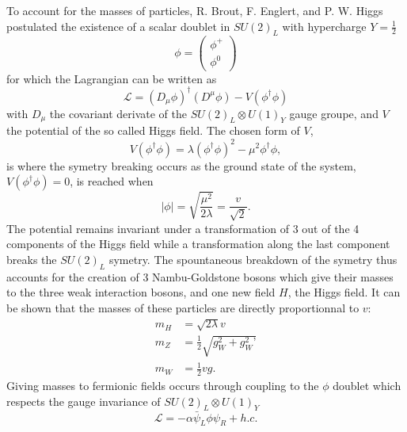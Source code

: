     To account for the masses of particles, R. Brout, F. Englert, and P. W. Higgs postulated the existence of a scalar doublet in $ SU(2)_L $ with hypercharge $ Y = \frac{1}{2} $
    \begin{equation}
      \phi = \left( \begin{matrix} \phi^+ \\ \phi^0 \end{matrix} \right)
    \end{equation}
    for which the Lagrangian can be written as
    \begin{equation}
      \mathcal{L} = \left( D_\mu \phi \right)^\dagger \left( D^\mu \phi \right) - V(\phi^\dagger \phi)
    \end{equation}
    with $ D_\mu $ the covariant derivate of the $ SU(2)_L \otimes U(1)_Y $ gauge groupe, and $ V $ the potential of the so called Higgs field. The chosen form of $ V $,
    \begin{equation}
      V(\phi^\dagger \phi) = \lambda \left( \phi^\dagger \phi \right)^2 - \mu^2 \phi^\dagger \phi ,
    \end{equation}
    is where the symetry breaking occurs as the ground state of the system, $ V(\phi^\dagger \phi) = 0 $, is reached when
    \begin{equation}
      \left| \phi \right| = \sqrt{\frac{\mu^2}{2 \lambda}} = \frac{v}{\sqrt{2}} .
    \end{equation}
    The potential remains invariant under a transformation of 3 out of the 4 components of the Higgs field while a transformation along the last component breaks the $ SU(2)_L $ symetry. The spountaneous breakdown of the symetry thus accounts for the creation of 3 Nambu-Goldstone bosons which give their masses to the three weak interaction bosons, and one new field $ H $, the Higgs field. It can be shown that the masses of these particles are directly proportionnal to $ v $:
    \begin{align}
      m_H & = \sqrt{2 \lambda} v \\
      m_Z & = \frac{1}{2} \sqrt{g_W^2 + g_W^2\text{'}} \\
      m_W & = \frac{1}{2} v g .
    \end{align}
    Giving masses to fermionic fields occurs through coupling to the $ \phi $ doublet which respects the gauge invariance of $ SU(2)_L \otimes U(1)_Y $
    \begin{equation}
      \mathcal{L} = - \alpha \bar{\psi}_L \phi \psi_R + h.c.
    \end{equation} \\

